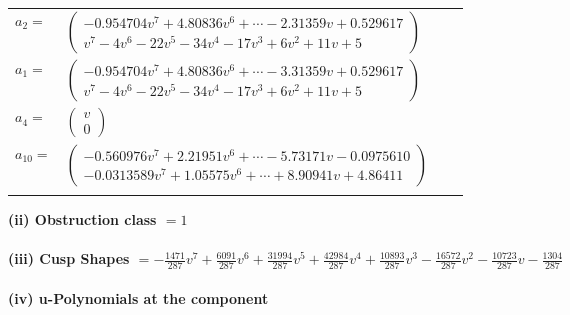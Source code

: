 \documentclass[1p]{elsarticle_modified}
\theoremstyle{definition}
\begin{document}
\begin{tabular}{m{7pt} m{180pt} m{7pt} m{180pt} }
\flushright $a_{2}=$&$\begin{pmatrix}-0.954704 v^{7}+4.80836 v^{6}+\cdots-2.31359 v+0.529617\\v^7-4 v^6-22 v^5-34 v^4-17 v^3+6 v^2+11 v+5\end{pmatrix}$ \\
\flushright $a_{1}=$&$\begin{pmatrix}-0.954704 v^{7}+4.80836 v^{6}+\cdots-3.31359 v+0.529617\\v^7-4 v^6-22 v^5-34 v^4-17 v^3+6 v^2+11 v+5\end{pmatrix}$ \\
\flushright $a_{4}=$&$\begin{pmatrix}v\\0\end{pmatrix}$ \\
\flushright $a_{10}=$&$\begin{pmatrix}-0.560976 v^{7}+2.21951 v^{6}+\cdots-5.73171 v-0.0975610\\-0.0313589 v^{7}+1.05575 v^{6}+\cdots+8.90941 v+4.86411\end{pmatrix}$\\&\end{tabular}
\flushleft \textbf{(ii) Obstruction class $= 1$}\\~\\
\flushleft \textbf{(iii) Cusp Shapes $= -\frac{1471}{287} v^7+\frac{6091}{287} v^6+\frac{31994}{287} v^5+\frac{42984}{287} v^4+\frac{10893}{287} v^3-\frac{16572}{287} v^2-\frac{10723}{287} v-\frac{1304}{287}$}\\~\\
\newpage\renewcommand{\arraystretch}{1}
\flushleft \textbf{(iv) u-Polynomials at the component}\newline \\
\end{document}
